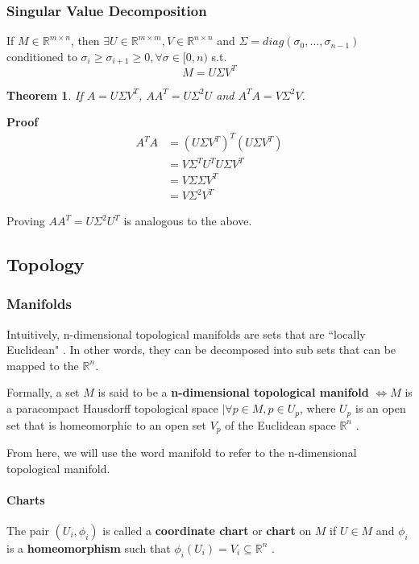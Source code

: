 \documentclass[12pt]{article}
\newtheorem{theorem}{Theorem}[section]
\begin{document}
\subsubsection{Singular Value Decomposition \cite{gan2008}}
\label{sec:svd}
If $M \in \mathbb{R}^{m \times n}$, then $\exists U \in \mathbb{R}^{m \times m}, V \in \mathbb{R}^{n \times n}$ and $\Sigma =  diag(\sigma_0, \dots, \sigma_{n-1})$ conditioned to $\sigma_i \ge \sigma_{i+1} \ge 0, \forall \sigma \in [0, n)$ s.t.
$$M = U\Sigma V^T$$

\begin{theorem}
	\label{th:svd-aat}
	If $A = U \Sigma V^T$, $AA^T = U \Sigma^2 U$ and $A^TA = V \Sigma^2 V$.
\end{theorem}
\textbf{Proof}
\begin{align*}
	A^TA &= (U\Sigma V^T)^T(U\Sigma V^T) \\
	&= V \Sigma^T U^T U \Sigma V^T \\
	&= V \Sigma \Sigma V^T \\
	&= V \Sigma^2 V^T
\end{align*}

Proving $AA^T = U \Sigma^2 U^T$ is analogous to the above.

\subsection{Topology}
\subsubsection{Manifolds}

Intuitively, n-dimensional topological manifolds are sets that are ``locally Euclidean" \cite{lee2009}. In other words, they can be decomposed into sub sets that can be mapped to the $\mathbb{R}^n$.

Formally, a set $M$ is said to be a \textbf{n-dimensional topological manifold} $\iff M$ is a paracompact Hausdorff topological space $\mid \forall p \in M, p \in U_p$, where $U_p$ is an open set that is homeomorphic to an open set $V_p$ of the Euclidean space $\mathbb{R}^n$ \cite{lee2009}.

From here, we will use the word manifold to refer to the n-dimensional topological manifold.

\paragraph{Charts}
The pair $(U_i, \phi_i)$ is called a \textbf{coordinate chart} or \textbf{chart} on $M$ if $U \in M$ and $\phi_i$ is a \textbf{homeomorphism} such that $\phi_i(U_i) = V_i \subseteq \mathbb{R}^n$ \cite{lee2012}.
\end{document}
